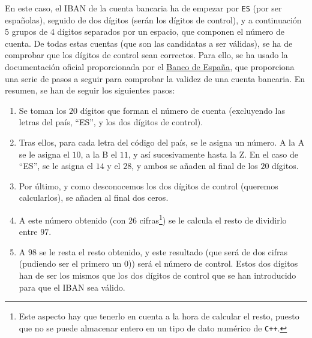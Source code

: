 \documentclass[12pt]{article}
\begin{document}
    En este caso, el IBAN de la cuenta bancaria ha de empezar por \verb|ES| (por ser españolas), seguido de dos dígitos (serán los dígitos de control), y a continuación 5 grupos de 4 dígitos separados por un espacio, que componen el número de cuenta. De todas estas cuentas (que son las candidatas a ser válidas), se ha de comprobar que los dígitos de control sean correctos. Para ello, se ha usado la documentación oficial proporcionada por el \href{https://clientebancario.bde.es/pcb/es/blog/que-se-esconde-tras-los-numeros-de-tu-cuenta-corriente-.html}{Banco de España}, que proporciona una serie de pasos a seguir para comprobar la validez de una cuenta bancaria. En resumen, se han de seguir los siguientes pasos:
    \begin{enumerate}
        \item Se toman los $20$ dígitos que forman el número de cuenta (excluyendo las letras del país, ``ES'', y los dos dígitos de control).
        \item Tras ellos, para cada letra del código del país, se le asigna un número. A la A se le asigna el $10$, a la B el $11$, y así sucesivamente hasta la Z. En el caso de ``ES'', se le asigna el $14$ y el $28$, y ambos se añaden al final de los $20$ dígitos.
        \item Por último, y como desconocemos los dos dígitos de control (queremos calcularlos), se añaden al final dos ceros.
        \item A este número obtenido (con $26$ cifras\footnote{Este aspecto hay que tenerlo en cuenta a la hora de calcular el resto, puesto que no se puede almacenar entero en un tipo de dato numérico de \texttt{C++}.}) se le calcula el resto de dividirlo entre $97$.
        \item A $98$ se le resta el resto obtenido, y este resultado (que será de dos cifras (pudiendo ser el primero un $0$)) será el número de control. Estos dos dígitos han de ser los mismos que los dos dígitos de control que se han introducido para que el IBAN sea válido.
    \end{enumerate}
\end{document}
